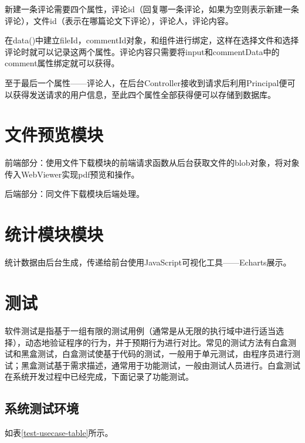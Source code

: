 新建一条评论需要四个属性，评论id（回复哪一条评论，如果为空则表示新建一条评论），文件id（表示在哪篇论文下评论），评论人，评论内容。

在data()中建立fileId，commentId对象，和组件进行绑定，这样在选择文件和选择评论时就可以记录这两个属性。评论内容只需要将input和commentData中的comment属性绑定就可以获得。

至于最后一个属性——评论人，在后台Controller接收到请求后利用Principal便可以获得发送请求的用户信息，至此四个属性全部获得便可以存储到数据库。

\section{文件预览模块}

前端部分：使用文件下载模块的前端请求函数从后台获取文件的blob对象，将对象传入WebViewer实现pdf预览和操作。

后端部分：同文件下载模块后端处理。

\section{统计模块模块}

统计数据由后台生成，传递给前台使用JavaScript可视化工具——Echarts展示。

\section{测试}

软件测试是指基于一组有限的测试用例（通常是从无限的执行域中进行适当选择），动态地验证程序的行为，并于预期行为进行对比\cite{.software}。常见的测试方法有白盒测试和黑盒测试，白盒测试使基于代码的测试，一般用于单元测试，由程序员进行测试；黑盒测试基于需求描述，通常用于功能测试，一般由测试人员进行。白盒测试在系统开发过程中已经完成，下面记录了功能测试。

\subsection{系统测试环境}

如表\ref{test-usecase-table}所示。


